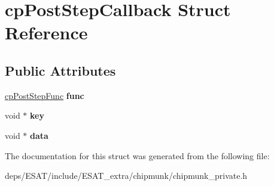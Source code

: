 \hypertarget{structcp_post_step_callback}{}\section{cp\+Post\+Step\+Callback Struct Reference}
\label{structcp_post_step_callback}
\subsection*{Public Attributes}
\begin{DoxyCompactItemize}
\item 
\mbox{\label{structcp_post_step_callback_a0733e08f69a9b0c993ca16b31ce2d2b8}} 
\mbox{\hyperlink{group__cp_space_ga93e9005e387fec86eeb4a225ac295a23}{cp\+Post\+Step\+Func}} {\bfseries func}
\item 
\mbox{\label{structcp_post_step_callback_aab8cd0fa6eb37c3df6e946075abe9cc1}} 
void $\ast$ {\bfseries key}
\item 
\mbox{\label{structcp_post_step_callback_aa781c6dea369d312674f5dc78d090017}} 
void $\ast$ {\bfseries data}
\end{DoxyCompactItemize}


The documentation for this struct was generated from the following file\+:\begin{DoxyCompactItemize}
\item 
deps/\+E\+S\+A\+T/include/\+E\+S\+A\+T\+\_\+extra/chipmunk/chipmunk\+\_\+private.\+h\end{DoxyCompactItemize}
